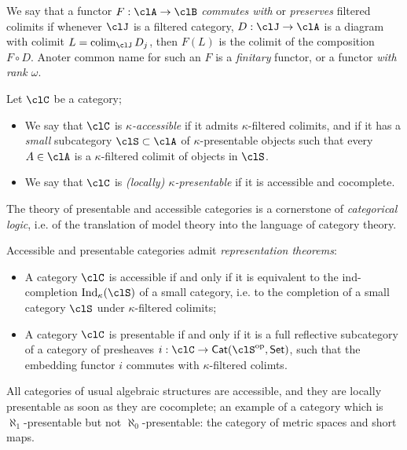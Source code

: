 We say that a functor $F : \clA \to \clB$ \emph{commutes with} or \emph{preserves} filtered colimits if whenever $\clJ$ is a filtered category, $D : \clJ \to \clA$ is a diagram with colimit $L=\colim_\clJ D_j$, then $F(L)$ is the colimit of the composition $F\circ D$. Anoter common name for such an $F$ is a \emph{finitary} functor, or a functor \emph{with rank $\omega$}.
\begin{definition}\label{accepre}
	Let $\clC$ be a category;
	\begin{itemize}
		\item We say that $\clC$ is \emph{$\kappa$\hyp{}accessible} if it admits $\kappa$\hyp{}filtered colimits, and if it has a \emph{small} subcategory $\clS\subset \clA$ of $\kappa$\hyp{}presentable objects such that every $A\in\clA$ is a $\kappa$\hyp{}filtered colimit of objects in $\clS$.
		\item We say that $\clC$ is \emph{(locally) $\kappa$\hyp{}presentable} if it is accessible and cocomplete.
	\end{itemize}
	The theory of presentable and accessible categories is a cornerstone of \emph{categorical logic}, i.e. of the translation of model theory into the language of category theory.

	Accessible and presentable categories admit \emph{representation theorems}:
	\begin{itemize}
		\item A category $\clC$ is accessible if and only if it is equivalent to the ind\hyp{}completion $\text{Ind}_\kappa(\clS)$ of a small category, i.e. to the completion of a small category $\clS$ under  $\kappa$\hyp{}filtered colimits;
		\item A category $\clC$ is presentable if and only if it is a full reflective subcategory of a category of presheaves $i : \clC \to \Qat(\clS^\op,\Set)$, such that the embedding functor $i$ commutes with $\kappa$\hyp{}filtered colimts.
	\end{itemize}
\end{definition}
All categories of usual algebraic structures are accessible, and they are locally presentable as soon as they are cocomplete; an example of a category which is $\aleph_1$\hyp{}presentable but not $\aleph_0$\hyp{}presentable: the category of metric spaces and short maps.

